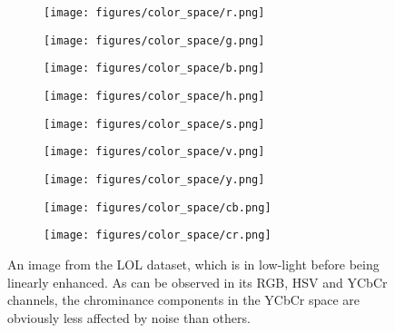 \documentclass[10pt,twocolumn,letterpaper]{article}
\begin{document}
\begin{figure}[t]
\begin{minipage}{\linewidth}
\begin{subfigure}{0.32\linewidth}
    \texttt{[image: figures/color\_space/r.png]}
\end{subfigure}
\begin{subfigure}{0.32\linewidth}
    \texttt{[image: figures/color\_space/g.png]}
\end{subfigure}
\begin{subfigure}{0.32\linewidth}
    \texttt{[image: figures/color\_space/b.png]}
\end{subfigure}

\begin{subfigure}{0.32\linewidth}
    \texttt{[image: figures/color\_space/h.png]}
\end{subfigure}
\begin{subfigure}{0.32\linewidth}
    \texttt{[image: figures/color\_space/s.png]}
\end{subfigure}
\begin{subfigure}{0.32\linewidth}
    \texttt{[image: figures/color\_space/v.png]}
\end{subfigure}

\begin{subfigure}{0.32\linewidth}
    \texttt{[image: figures/color\_space/y.png]}
\end{subfigure}
\begin{subfigure}{0.32\linewidth}
    \texttt{[image: figures/color\_space/cb.png]}
\end{subfigure}
\begin{subfigure}{0.32\linewidth}
    \texttt{[image: figures/color\_space/cr.png]}
\end{subfigure}

\caption{An image from the LOL dataset, which is in low-light before being linearly enhanced. As can be observed in its RGB, HSV and YCbCr channels, the chrominance components in the YCbCr space are obviously less affected by noise than others.} 
\label{fig:colorspace}
\end{minipage}


\end{figure}
\end{document}
